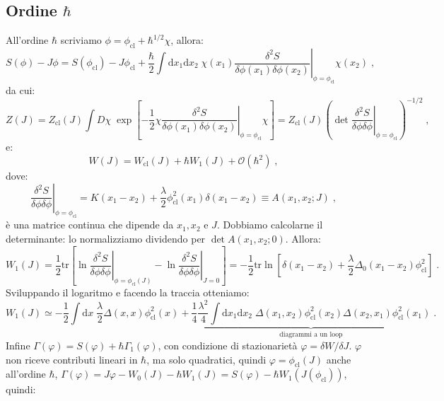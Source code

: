 \documentclass[12pt,a4paper]{article}
\theoremstyle{definition}
\numberwithin{equation}{section}
\newcommand{\diff}[1][]{\mathrm{d}#1}
\newcommand{\tr}{\mathrm{tr}}
\begin{document}
\subsection{Ordine $\hbar$}
All'ordine $\hbar$ scriviamo $\phi=\phi_{\mathrm{cl}}+\hbar^{1/2}\chi$, allora:
\begin{equation}
S(\phi)-J\phi=S(\phi_{\mathrm{cl}})-J\phi_{\mathrm{cl}}+\frac{\hbar}{2}\int\diff{x_1}\diff{x_2}\;\chi(x_1)\left.\frac{\delta^2 S}{\delta\phi(x_1)\delta\phi(x_2)}\right|_{\phi=\phi_{\mathrm{cl}}}\chi(x_2)\;,
\end{equation}
da cui:
\begin{equation}
Z(J)=Z_{\mathrm{cl}}(J)\int D\chi\;\exp\left[-\frac{1}{2}\chi\left.\frac{\delta^2S}{\delta \phi(x_1)\delta\phi(x_2)}\right|_{\phi=\phi_{\mathrm{cl}}}\chi\right]=Z_{\mathrm{cl}}(J)\left(\det\left.\frac{\delta^2 S}{\delta\phi\delta\phi}\right|_{\phi=\phi_{\mathrm{cl}}}\right)^{-1/2}\;,
\end{equation}
e:
\begin{equation}
W(J)=W_{\mathrm{cl}}(J)+\hbar W_1(J)+\mathcal{O}(\hbar^2)\;,
\end{equation}
dove:
\begin{equation}
\left.\frac{\delta^2 S}{\delta\phi\delta\phi}\right|_{\phi=\phi_{\mathrm{cl}}}=K(x_1-x_2)+\frac{\lambda}{2}\phi_{\mathrm{cl}}^2(x_1)\delta(x_1-x_2)\equiv A(x_1,x_2;J)\;,
\end{equation}
è una matrice continua che dipende da $x_1,x_2$ e $J$. Dobbiamo calcolarne il determinante: lo normalizziamo dividendo per $\det A(x_1,x_2;0)$. Allora:
$$
W_1(J)=\frac{1}{2}\tr\left[\ln\left.\frac{\delta^2 S}{\delta\phi\delta\phi}\right|_{\phi=\phi_{\mathrm{cl}}(J)}-\ln\left.\frac{\delta^2 S}{\delta\phi\delta\phi}\right|_{J=0}\right]=-\frac{1}{2}\tr\ln\left[\delta(x_1-x_2)+\frac{\lambda}{2}\Delta_0(x_1-x_2)\phi_{\mathrm{cl}}^2\right]\;.
$$
Sviluppando il logaritmo e facendo la traccia otteniamo:
\begin{equation}
W_1(J)\simeq-\frac{1}{2}\int\diff{x}\;\frac{\lambda}{2}\Delta(x,x)\phi_{\mathrm{cl}}^2(x)+\underbrace{\frac{1}{4}\frac{\lambda^2}{4}\int\diff{x_1}\diff{x_2}\;\Delta(x_1,x_2)\phi_{\mathrm{cl}}^2(x_2)\Delta(x_2,x_1)\phi_{\mathrm{cl}}^2(x_1)}_{\mbox{diagrammi a un loop}}\;.
\end{equation}
Infine $\Gamma(\varphi)=S(\varphi)+\hbar\Gamma_1(\varphi)$, con condizione di stazionarietà $\varphi=\delta W/\delta J$. $\varphi$ non riceve contributi lineari in $\hbar$, ma solo quadratici, quindi $\varphi=\phi_{\mathrm{cl}}(J)$ anche all'ordine $\hbar$, $\Gamma(\varphi)=J\varphi-W_0(J)-\hbar W_1(J)=S(\varphi)-\hbar W_1(J(\phi_{\mathrm{cl}}))$, quindi:
\end{document}
